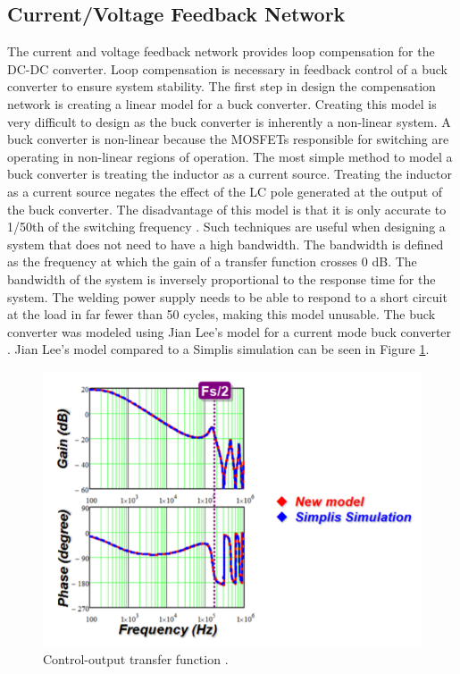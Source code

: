 \documentclass[11pt]{article}
\begin{document}
    \subsection{Current/Voltage Feedback Network}
    
    \noindent The current and voltage feedback network provides loop compensation for the DC-DC converter. Loop compensation is necessary in feedback control of a buck converter to ensure system stability. The first step in design the compensation network is creating a linear model for a buck converter. Creating this model is very difficult to design as the buck converter is inherently a non-linear system. A buck converter is non-linear because the MOSFETs responsible for switching are operating in non-linear regions of operation. The most simple method to model a buck converter is treating the inductor as a current source. Treating the inductor as a current source negates the effect of the LC pole generated at the output of the buck converter. The disadvantage of this model is that it is only accurate to 1/50th of the switching frequency \cite{j._li_current-mode_2009}. Such techniques are useful when designing a system that does not need to have a high bandwidth. The bandwidth is defined as the frequency at which the gain of a transfer function crosses 0 dB. The bandwidth of the system is inversely proportional to the response time for the system. The welding power supply needs to be able to respond to a short circuit at the load in far fewer than 50 cycles, making this model unusable.
    \newline
    \newline
    \noindent The buck converter was modeled using Jian Lee's model for a current mode buck converter \cite{j._li_current-mode_2009}. Jian Lee's model compared to a Simplis simulation can be seen in Figure \ref{jianlee}.
    
    \begin{figure}[H]
        \centering
        \includegraphics[width=0.7\linewidth]{controloutput.PNG}
        \caption{Control-output transfer function \cite{j._li_current-mode_2009}.}
        \label{jianlee}
    \end{figure}
    
\end{document}
